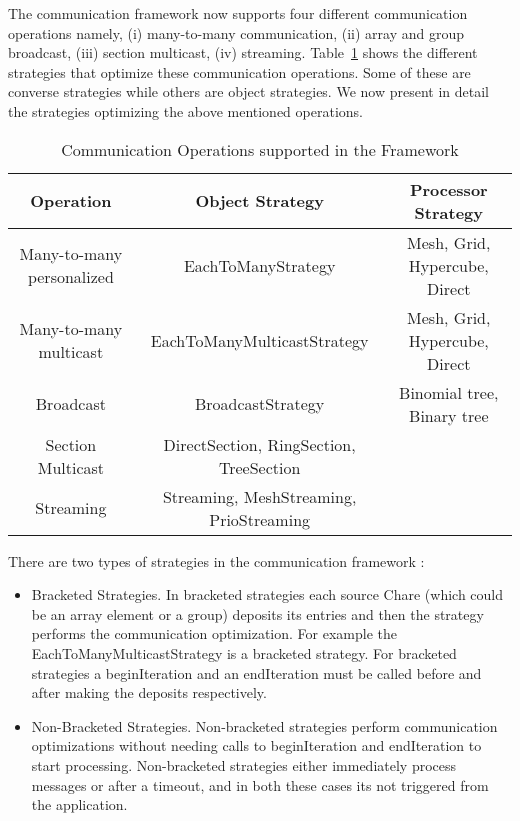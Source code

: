 The communication framework now supports four different
communication operations namely, (i) many-to-many communication, (ii)
array and group broadcast, (iii) section multicast, (iv)
streaming. Table~\ref{tbl:com_operation} shows the different
strategies that optimize these communication operations. Some of these
are converse strategies while others are object strategies. We now
present in detail the strategies optimizing the above mentioned
operations.


\begin{table}[h]
\begin{center}
\begin{small}
\begin{tabular}{|c|c|c|}
\hline
{\bf Operation} & {\bf Object Strategy} & {\bf Processor Strategy} \\
\hline
Many-to-many  personalized & EachToManyStrategy & Mesh, Grid, Hypercube, Direct \\
Many-to-many  multicast    & EachToManyMulticastStrategy & Mesh, Grid, Hypercube, Direct \\
Broadcast  & BroadcastStrategy & Binomial tree, Binary tree\\
Section Multicast & DirectSection, RingSection, TreeSection & \\
Streaming  & Streaming, MeshStreaming, PrioStreaming & \\
\hline
\end{tabular}
\end{small}
\end{center}
\caption{Communication Operations supported in the Framework}
\label{tbl:com_operation}
\end{table}

There are two types of strategies in the communication framework :

\begin{itemize}

\item Bracketed Strategies. In bracketed strategies each source Chare
(which could be an array element or a group) deposits its entries and
then the strategy performs the communication optimization. For example
the EachToManyMulticastStrategy is a bracketed strategy. For bracketed
strategies a beginIteration and an endIteration must be called before
and after making the deposits respectively. 

\item Non-Bracketed Strategies. Non-bracketed strategies perform communication
optimizations without needing calls to beginIteration and
endIteration to start processing. Non-bracketed strategies either immediately process messages 
or after a timeout, and in both these cases its not triggered from the application.

\end{itemize}

